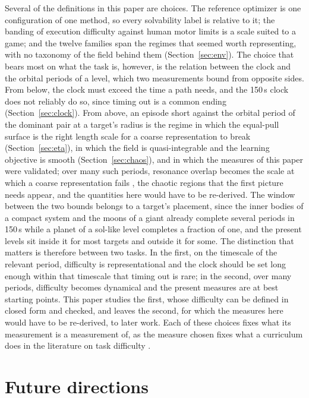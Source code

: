 \documentclass[11pt]{article}
\begin{document}
Several of the definitions in this paper are choices. The reference
optimizer is one configuration of one method, so every solvability label is
relative to it; the banding of execution difficulty against human motor
limits is a scale suited to a game; and the twelve families span the
regimes that seemed worth representing, with no taxonomy of the field
behind them (Section~\ref{sec:env}). The choice that bears most on what
the task is, however, is the relation between the clock and the orbital
periods of a level, which two measurements bound from opposite sides. From
below, the clock must exceed the time a path needs, and the 150\,s clock
does not reliably do so, since timing out is a common ending
(Section~\ref{sec:clock}). From above, an episode short against the
orbital period of the dominant pair at a target's radius is the regime in
which the equal-pull surface is the right length scale for a coarse
representation to break (Section~\ref{sec:eta}), in which the field is
quasi-integrable and the learning objective is smooth
(Section~\ref{sec:chaos}), and in which the measures of this paper were
validated; over many such periods, resonance overlap becomes the scale at
which a coarse representation fails \cite{chirikov1979,wisdom1980}, the
chaotic regions that the first picture needs appear, and the quantities
here would have to be re-derived. The window between the two bounds belongs to a target's placement, since
the inner bodies of a compact system and the moons of a giant already
complete several periods in 150\,s while a planet of a sol-like level
completes a fraction of one, and the present levels sit inside it for most
targets and outside it for some. The distinction that matters is therefore between two
tasks. In the first, on the timescale of the relevant period, difficulty is
representational and the clock should be set long enough within that
timescale that timing out is rare; in the second, over many periods,
difficulty becomes dynamical and the present measures are at best starting
points. This paper studies the first, whose difficulty can be defined in
closed form and checked, and leaves the second, for which the measures here
would have to be re-derived, to later work. Each of these choices fixes what its measurement is a measurement of, as
the measure chosen fixes what a curriculum does in the literature on task
difficulty \cite{furuta2021,narvekar2020,rutherford2024}.

\section{Future directions}
\label{sec:future}
\end{document}
